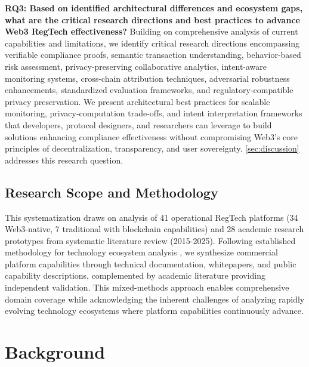 \documentclass[conference,compsoc]{IEEEtran}
\begin{document}
\noindent\textbf{RQ3: Based on identified architectural differences and ecosystem gaps, what are the critical research directions and best practices to advance Web3 RegTech effectiveness?}
Building on comprehensive analysis of current capabilities and limitations, we identify critical research directions encompassing verifiable compliance proofs, semantic transaction understanding, behavior-based risk assessment, privacy-preserving collaborative analytics, intent-aware monitoring systems, cross-chain attribution techniques, adversarial robustness enhancements, standardized evaluation frameworks, and regulatory-compatible privacy preservation. We present architectural best practices for scalable monitoring, privacy-computation trade-offs, and intent interpretation frameworks that developers, protocol designers, and researchers can leverage to build solutions enhancing compliance effectiveness without compromising Web3's core principles of decentralization, transparency, and user sovereignty. \autoref{sec:discussion} addresses this research question.

\subsection{Research Scope and Methodology}
This systematization draws on analysis of 41 operational RegTech platforms (34 Web3-native, 7 traditional with blockchain capabilities) and 28 academic research prototypes from systematic literature review (2015-2025). Following established methodology for technology ecosystem analysis \cite{arner2016fintechregtechreconceptualization,bonneau2015sokresearchperspectives}, we synthesize commercial platform capabilities through technical documentation, whitepapers, and public capability descriptions, complemented by academic literature providing independent validation. This mixed-methods approach enables comprehensive domain coverage while acknowledging the inherent challenges of analyzing rapidly evolving technology ecosystems where platform capabilities continuously advance.






\section{Background}
\end{document}
